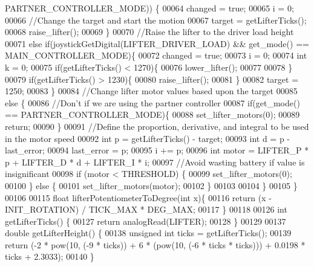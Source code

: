 \begin{DoxyCode}
      PARTNER_CONTROLLER_MODE)) \{
00064     changed = \textcolor{keyword}{true};
00065     i = 0;
00066     \textcolor{comment}{//Change the target and start the motion}
00067     target = getLifterTicks();
00068     raise_lifter();
00069   \}
00070   \textcolor{comment}{//Raise the lifter to the driver load height}
00071   \textcolor{keywordflow}{else} \textcolor{keywordflow}{if}(joystickGetDigital(LIFTER_DRIVER_LOAD) && get_mode() == 
      MAIN_CONTROLLER_MODE)\{
00072     changed = \textcolor{keyword}{true};
00073     i = 0;
00074     \textcolor{keywordtype}{int} k = 0;
00075     \textcolor{keywordflow}{if}(getLifterTicks() < 1270)\{
00076       lower_lifter();
00077 
00078     \}
00079     \textcolor{keywordflow}{if}(getLifterTicks() > 1230)\{
00080       raise_lifter();
00081     \}
00082     target = 1250;
00083   \}
00084   \textcolor{comment}{//Change lifter motor values based upon the target}
00085   \textcolor{keywordflow}{else} \{
00086     \textcolor{comment}{//Don't if we are using the partner controller}
00087     \textcolor{keywordflow}{if}(get_mode() == PARTNER_CONTROLLER_MODE)\{
00088       set_lifter_motors(0);
00089       \textcolor{keywordflow}{return};
00090     \}
00091     \textcolor{comment}{//Define the proportion, derivative, and integral to be used in the motor speed}
00092     \textcolor{keywordtype}{int} p = getLifterTicks() - target;
00093     \textcolor{keywordtype}{int} d = p - last\_error;
00094     last\_error = p;
00095     i += p;
00096     \textcolor{keywordtype}{int} motor = LIFTER_P * p + LIFTER_D * d + LIFTER_I * i;
00097     \textcolor{comment}{//Avoid wasting battery if value is insignificant}
00098     \textcolor{keywordflow}{if} (motor < THRESHOLD) \{
00099         set_lifter_motors(0);
00100     \} \textcolor{keywordflow}{else} \{
00101         set_lifter_motors(motor);
00102     \}
00103 
00104   \}
00105 \}
00106 
00115 \textcolor{keywordtype}{float} lifterPotentiometerToDegree(\textcolor{keywordtype}{int} x)\{
00116   \textcolor{keywordflow}{return} (x - INIT_ROTATION) / TICK_MAX * DEG_MAX;
00117 \}
00118 
00126 \textcolor{keywordtype}{int} getLifterTicks() \{
00127   \textcolor{keywordflow}{return} analogRead(LIFTER);
00128 \}
00129 
00137 \textcolor{keywordtype}{double} getLifterHeight() \{
00138   \textcolor{keywordtype}{unsigned} \textcolor{keywordtype}{int} ticks = getLifterTicks();
00139   \textcolor{keywordflow}{return} (-2 * pow(10, (-9 * ticks)) + 6 * (pow(10, (-6 * ticks * ticks))) + 0.0198 * ticks + 2.3033);
00140 \}
\end{DoxyCode}
